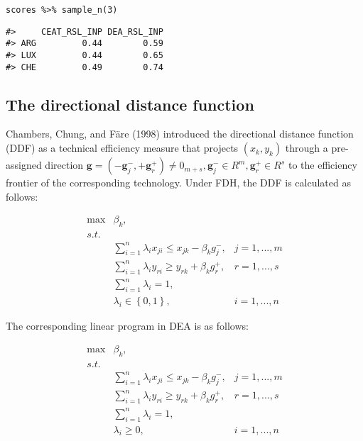 \begin{verbatim}
scores %>% sample_n(3)
\end{verbatim}

\begin{verbatim}
#>     CEAT_RSL_INP DEA_RSL_INP
#> ARG         0.44        0.59
#> LUX         0.44        0.65
#> CHE         0.49        0.74
\end{verbatim}

\hypertarget{the-directional-distance-function}{%
\subsection{The directional distance function}\label{the-directional-distance-function}}

Chambers, Chung, and Färe (1998) introduced the directional distance function (DDF) as a technical efficiency measure that projects
\((\textit{x}_k, \textit{y}_k)\)
through a pre-assigned direction \(\textbf{g}=(-\textbf{g}_{j}^{-},+\textbf{g}_{r}^{+}) \ne 0_{m+s}, \textbf{g}_{j}^{-} \in R^{m}, \textbf{g}_{r}^{+} \in R^{s}\) to the efficiency frontier of the corresponding technology. Under FDH, the DDF is calculated as follows:

\begin{equation} \label{(27)} 
\begin{array}{lllll} 
{} & {\max } & {\beta_{k}, } & {} & {} \\ 
{} & {s.t.} & {} & {} & {} \\ 
{} & {} & {\sum_{i=1}^{n}\lambda_{i} x_{ji}  \le x_{jk} -\beta_{k} g_{j}^{-} ,} & {j=1,...,m} & {} \\ 
{} & {} & {\sum_{i=1}^{n}\lambda_{i} y_{ri}  \ge y_{rk} +\beta_{k} g_{r}^{+} ,} & {r=1,...,s} & {} \\ 
{} & {} & {\sum_{i=1}^{n}\lambda _{i}  =1,} & {} & {} \\ 
{} & {} & {\lambda _{i} \in \left\{0,1\right\},} & {i=1,...,n} & {} 
\end{array} 
\end{equation}

The corresponding linear program in DEA is as follows:

\begin{equation} \label{(28)} 
\begin{array}{lllll} 
{} & {\max } & {\beta_{k}, } & {} & {} \\ 
{} & {s.t.} & {} & {} & {} \\ 
{} & {} & {\sum_{i=1}^{n}\lambda_{i} x_{ji} \le x_{jk} -\beta_{k} g_{j}^{-} ,} & {j=1,...,m} & {} \\ 
{} & {} & {\sum_{i=1}^{n}\lambda_{i} y_{ri}  \ge y_{rk} +\beta_{k} g_{r}^{+} ,} & {r=1,...,s} & {} \\ 
{} & {} & {\sum_{i=1}^{n}\lambda_{i}=1,} & {} & {} \\ 
{} & {} & {\lambda_{i} \ge 0,} & {i=1,...,n} & {} 
\end{array} 
\end{equation}

